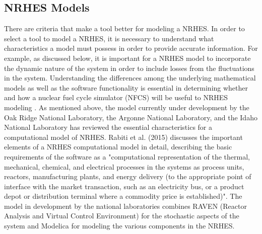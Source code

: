 \documentclass{article}                                                                           %
\begin{document}
\begin{linenumbers}
\section{NRHES Models}
There are criteria that make a tool better for modeling a NRHES. In order to select a tool to model a NRHES, it is necessary to understand what characteristics a model must possess in order to provide accurate information. For example, as discussed below, it is important for a NRHES model to incorporate the dynamic nature of the system in order to include losses from the fluctuations in the system. Understanding the differences among the underlying mathematical models as well as the software functionality is essential in determining whether and how a nuclear fuel cycle simulator (NFCS) will be useful to NRHES modeling .
As mentioned above, the model currently under development by the Oak Ridge National Laboratory, the Argonne National Laboratory, and the Idaho National Laboratory has reviewed the essential characteristics for a computational model of NRHES. Rabiti et al. (2015) discusses the important elements of a NRHES computational model in detail, describing the basic requirements of the software as a "computational representation of the thermal, mechanical, chemical, and electrical processes in the systems as process units, reactors, manufacturing plants, and energy delivery (to the appropriate point of interface with the market transaction, such as an electricity bus, or a product depot or distribution terminal where a commodity price is established)"\cite{Rabiti2015}. The model in development by the national laboratories combines RAVEN (Reactor Analysis and Virtual Control Environment) for the stochastic aspects of the system and Modelica for modeling the various components in the NRHES.


\end{linenumbers}
\end{document}
